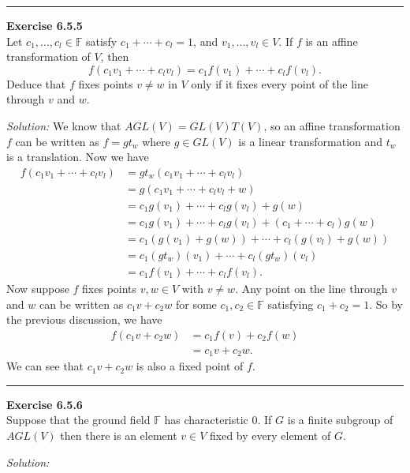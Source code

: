 \documentclass[a4paper, 12pt]{article}
\newenvironment{problem}[2][Exercise]
    { \begin{mdframed}[backgroundcolor=gray!20] \textbf{#1 #2} \\}
    {  \end{mdframed}}
\newenvironment{solution}
    {\textit{Solution:}}
    {}
\begin{document}
\noindent\rule{7in}{2.8pt}
\begin{problem}{6.5.5}
Let \(c_1,\ldots,c_l\in \mathbb{F}\) satisfy \(c_1+\cdots+c_l=1\), and \(v_1,\ldots,v_l\in V\). If \(f\) is an affine transformation of \(V\), then 
\[f(c_1v_1+\cdots+c_lv_l)=c_1f(v_1)+\cdots+c_lf(v_l).\]
Deduce that \(f\) fixes points \(v\neq w\) in \(V\) only if it fixes every point of the line through \(v\) and \(w\).
\end{problem}
\begin{solution}
We know that \(AGL(V)=GL(V)T(V)\), so an affine transformation \(f\) can be written as \(f=g t_w\) where \(g\in GL(V)\) is a linear transformation and \(t_w\) is a translation. Now we have 
\begin{align*}
    f(c_1v_1+\cdots+c_lv_l)&=gt_w(c_1v_1+\cdots+c_lv_l)\\ 
                           &=g(c_1v_1+\cdots+c_lv_l+w)\\ 
                           &=c_1g(v_1)+\cdots+c_lg(v_l)+g(w)\\ 
                           &=c_1g(v_1)+\cdots+c_lg(v_l)+(c_1+\cdots+c_l)g(w)\\ 
                           &=c_1(g(v_1)+g(w))+\cdots+c_l(g(v_l)+g(w))\\ 
                           &=c_1(gt_w)(v_1)+\cdots+c_l(gt_w)(v_l)\\ 
                           &=c_1f(v_1)+\cdots+c_lf(v_l).
\end{align*}
Now suppose \(f\) fixes points \(v,w\in V\) with \(v\neq w\). Any point on the line through \(v\) and \(w\) can be written as \(c_1v+c_2w\) for some \(c_1,c_2\in \mathbb{F}\) satisfying \(c_1+c_2=1\). So by the 
previous discussion, we have 
\begin{align*}
    f(c_1v+c_2w)&=c_1f(v)+c_2f(w)\\ 
                &=c_1v+c_2w.
\end{align*}
We can see that \(c_1v+c_2w\) is also a fixed point of \(f\).
\end{solution}

\noindent\rule{7in}{2.8pt}
\begin{problem}{6.5.6}
Suppose that the ground field \(\mathbb{F}\) has characteristic \(0\). If \(G\) is a finite subgroup of \(AGL(V)\) then there is an element \(v\in V\) fixed by every element of \(G\).
\end{problem}
\begin{solution}
    
\end{solution}
\end{document}
